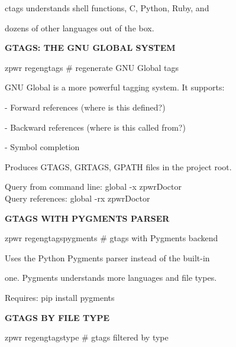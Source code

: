 \documentclass[11pt,a4paper,twoside]{book}
\begin{document}
ctags understands shell functions, C, Python, Ruby, and

dozens of other languages out of the box.


\vspace{12pt}
{\bfseries\color{neonyellow} GTAGS: THE GNU GLOBAL SYSTEM}\vspace{4pt}

\begin{codebox}
zpwr regengtags                     \# regenerate GNU Global tags\\
\end{codebox}

GNU Global is a more powerful tagging system. It supports:

- Forward references (where is this defined?)

- Backward references (where is this called from?)

- Symbol completion

Produces GTAGS, GRTAGS, GPATH files in the project root.

\begin{codebox}
Query from command line: global -x zpwrDoctor\\
Query references: global -rx zpwrDoctor\\
\end{codebox}


\vspace{12pt}
{\bfseries\color{neonyellow} GTAGS WITH PYGMENTS PARSER}\vspace{4pt}

\begin{codebox}
zpwr regengtagspygments             \# gtags with Pygments backend\\
\end{codebox}

Uses the Python Pygments parser instead of the built-in

one. Pygments understands more languages and file types.

\begin{codebox}
Requires: pip install pygments\\
\end{codebox}


\vspace{12pt}
{\bfseries\color{neonyellow} GTAGS BY FILE TYPE}\vspace{4pt}

\begin{codebox}
zpwr regengtagstype                 \# gtags filtered by type\\
\end{codebox}
\end{document}
